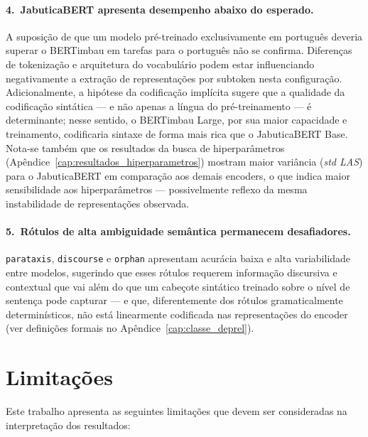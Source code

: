 \paragraph{4.\ JabuticaBERT apresenta desempenho abaixo do esperado.} A suposição de que um
modelo pré-treinado exclusivamente em português deveria superar o BERTimbau em tarefas para
o português não se confirma. Diferenças de tokenização e arquitetura do vocabulário podem
estar influenciando negativamente a extração de representações por subtoken nesta configuração.
Adicionalmente, a hipótese da codificação implícita sugere que a qualidade da codificação
sintática — e não apenas a língua do pré-treinamento — é determinante; nesse sentido, o
BERTimbau Large, por sua maior capacidade e treinamento, codificaria sintaxe de forma mais
rica que o JabuticaBERT Base. Nota-se também que os resultados da busca de hiperparâmetros
(Apêndice~\ref{cap:resultados_hiperparametros}) mostram maior variância (\textit{std LAS}) para
o JabuticaBERT em comparação aos demais encoders, o que indica maior sensibilidade aos
hiperparâmetros — possivelmente reflexo da mesma instabilidade de representações observada.

\paragraph{5.\ Rótulos de alta ambiguidade semântica permanecem desafiadores.} \texttt{parataxis},
\texttt{discourse} e \texttt{orphan} apresentam acurácia baixa e alta variabilidade entre
modelos, sugerindo que esses rótulos requerem informação discursiva e contextual que vai além
do que um cabeçote sintático treinado sobre o nível de sentença pode capturar — e que,
diferentemente dos rótulos gramaticalmente determinísticos, não está linearmente codificada
nas representações do encoder (ver definições formais no Apêndice~\ref{cap:classe_deprel}).

\section{Limitações}
\label{sec:limitacoes}

Este trabalho apresenta as seguintes limitações que devem ser consideradas na interpretação dos
resultados:

